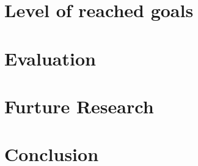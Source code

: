 \documentclass[a4paper,pt12]{article}
\begin{document}
\section{Level of reached goals}


\section{Evaluation}


\section{Furture Research}


\section{Conclusion}



%
%
\end{document}
